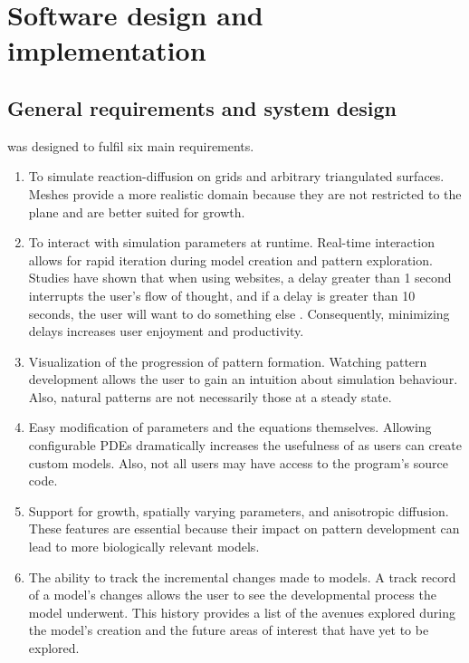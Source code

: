 \chapter{Software design and  implementation}

\section{General requirements and system design}
\ProgramName{} was designed to fulfil six main requirements.

\begin{enumerate}
	\item To simulate reaction-diffusion on grids and arbitrary triangulated surfaces. Meshes provide a more realistic domain because they are not restricted to the plane and are better suited for growth. 
	
	\item To interact with simulation parameters at runtime. Real-time interaction allows for rapid iteration during model creation and pattern exploration. Studies have shown that when using websites, a delay greater than 1 second interrupts the user's flow of thought, and if a delay is greater than 10 seconds, the user will want to do something else \citep{nielsen1994}. Consequently, minimizing delays increases user enjoyment and productivity. 

	\item Visualization of the progression of pattern formation. Watching pattern development allows the user to gain an intuition about simulation behaviour. Also, natural patterns are not necessarily those at a steady state.
	
	\item Easy modification of parameters and the equations themselves. Allowing configurable PDEs dramatically increases the usefulness of \ProgramName{} as users can create custom models. Also, not all users may have access to the program's source code. 
		
	\item Support for growth, spatially varying parameters, and anisotropic diffusion. These features are essential because their impact on pattern development can lead to more biologically relevant models. 
	
	\item The ability to track the incremental changes made to models. A track record of a model's changes allows the user to see the developmental process the model underwent. This history provides a list of the avenues explored during the model's creation and the future areas of interest that have yet to be explored.
	
\end{enumerate}

